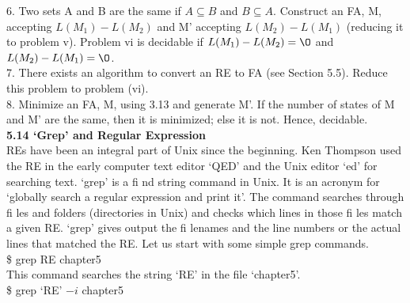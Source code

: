\documentclass[8pt]{beamer}
\begin{document}
\begin{frame}
\small{
\textcolor[rgb]{0.00,0.00,1.00}{6}. Two sets A and B are the same if $A \subseteq B$ and $B \subseteq A$. Construct an FA, M, accepting $L(M_1) - L(M_2)$
and M' accepting $L(M_2) - L(M_1)$ (reducing it to problem v). Problem vi is decidable if $L(M_1) -
L(M_2) = {\O}$ and $L(M_2) - L(M_1) = {\O}$.\\

\textcolor[rgb]{0.00,0.00,1.00}{7}. There exists an algorithm to convert an RE to FA (see Section 5.5). Reduce this problem to problem (vi).\\

\textcolor[rgb]{0.00,0.00,1.00}{8}. Minimize an FA, M, using 3.13 and generate M'. If the number of states of M and M' are the same,
then it is minimized; else it is not. Hence, decidable.}\\

\vspace*{0.2cm}
\large{
\textbf{5.14 ‘Grep’ and Regular Expression}\\
}
\small{
REs have been an integral part of Unix since the beginning. Ken Thompson used the RE in the early
computer text editor ‘QED’ and the Unix editor ‘ed’ for searching text. ‘grep’ is a fi nd string command
in Unix. It is an acronym for ‘globally search a regular expression and print it’. The command searches
through fi les and folders (directories in Unix) and checks which lines in those fi les match a given RE.
‘grep’ gives output the fi lenames and the line numbers or the actual lines that matched the RE.
Let us start with some simple grep commands.}\\

\hspace*{4cm}  \$ grep RE chapter5\\

\hspace*{0.5cm} This command searches the string ‘RE’ in the file ‘chapter5’.\\

\hspace*{4cm}  \$ grep ‘RE’ $-i$ chapter5\\
\end{frame}
\end{document}
